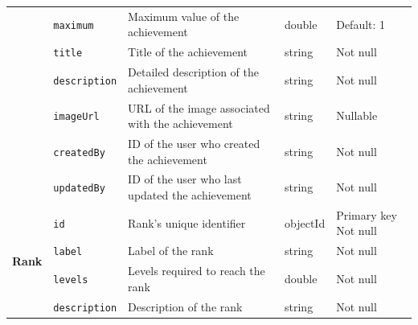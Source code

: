 \begin{landscape}
\begin{longtable}{ | m{} | m{} | m{} | m{} | m{} | }
        \cline{2-5}
                                                                         & \texttt{maximum}                          & Maximum value of the achievement                                     & double        & Default: 1                    \\
        \cline{2-5}
                                                                         & \texttt{title}                            & Title of the achievement                                             & string        & Not null                      \\
        \cline{2-5}
                                                                         & \texttt{description}                      & Detailed description of the achievement                              & string        & Not null                      \\
        \cline{2-5}
                                                                         & \texttt{imageUrl}                         & URL of the image associated with the achievement                     & string        & Nullable                      \\
        \cline{2-5}
                                                                         & \texttt{createdBy}                        & ID of the user who created the achievement                           & string        & Not null                      \\
        \cline{2-5}
                                                                         & \texttt{updatedBy}                        & ID of the user who last updated the achievement                      & string        & Not null                      \\
        \hline
        \multirow[t]{4}{5em}{\textbf{Rank}}                              & \texttt{id}                               & Rank's unique identifier                                             & objectId      & Primary key \newline Not null \\
        \cline{2-5}
                                                                         & \texttt{label}                            & Label of the rank                                                    & string        & Not null                      \\
        \cline{2-5}
                                                                         & \texttt{levels}                           & Levels required to reach the rank                                    & double        & Not null                      \\
        \cline{2-5}
                                                                         & \texttt{description}                      & Description of the rank                                              & string        & Not null                      \\
        \hline
    \end{longtable}
\end{landscape}

